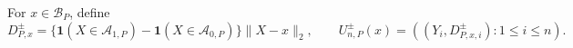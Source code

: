 For \(x\in\mathcal B_P\), define
\[
 D^{\pm}_{P,x}=\{\mathbf 1(X\in\mathcal A_{1,P})-\mathbf 1(X\in\mathcal A_{0,P})\}\lVert X-x\rVert_2,
 \qquad
 U^{\pm}_{n,P}(x)=((Y_i,D^{\pm}_{P,x,i}):1\leq i\leq n).
\]